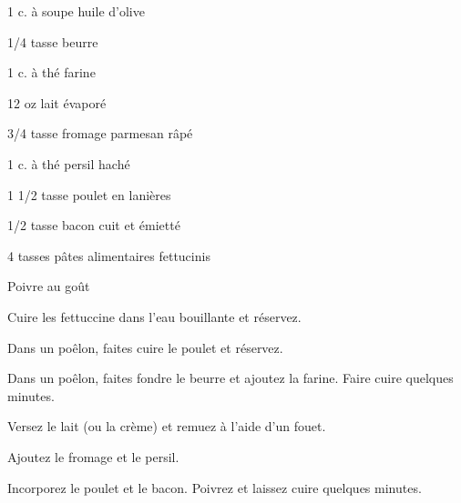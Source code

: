


\totaltime{}


\begin{ingredients}
    \item 1 c. à soupe huile d'olive
    \item 1/4 tasse beurre
    \item 1 c. à thé farine
    \item 12 oz lait évaporé
    \item 3/4 tasse fromage parmesan râpé
    \item 1 c. à thé persil haché
    \item 1 1/2 tasse poulet en lanières
    \item 1/2 tasse bacon cuit et émietté
    \item 4 tasses pâtes alimentaires fettucinis
    \item Poivre au goût
\end{ingredients}

\begin{steps}
    \item Cuire les fettuccine dans l'eau bouillante et réservez.
    \item Dans un poêlon, faites cuire le poulet et réservez.
    \item Dans un poêlon, faites fondre le beurre et ajoutez la farine. Faire cuire quelques minutes.
    \item Versez le lait (ou la crème) et remuez à l'aide d'un fouet.
    \item Ajoutez le fromage et le persil.
    \item Incorporez le poulet et le bacon. Poivrez et laissez cuire quelques minutes.
\end{steps}
